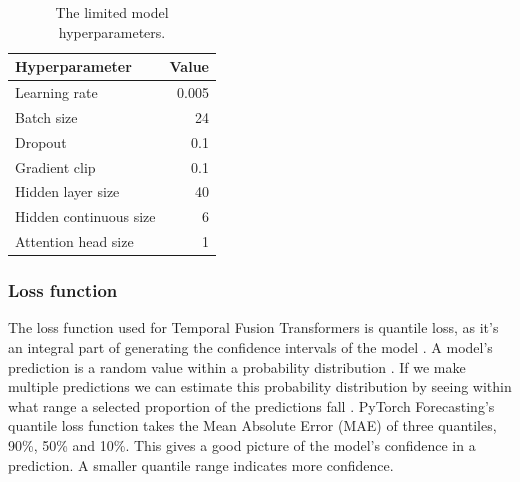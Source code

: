         \begin{table}[ht!]
        \begin{center}
        \caption{The limited model hyperparameters.
        \label{tab:lim_params}}
        \vspace{0.5cm}
        \begin{tabular}{|l|r|}
        \hline
        \textbf{Hyperparameter} & \textbf{Value} \\ \hline
        Learning rate            & 0.005         \\ \hline
        Batch size              & 24            \\ \hline
        Dropout                 & 0.1            \\ \hline
        Gradient clip           & 0.1           \\ \hline
        Hidden layer size            & 40         \\ \hline
        Hidden continuous size & 6         \\ \hline
        Attention head size    & 1         \\ \hline
        \end{tabular}
        
        \end{center}
        \end{table}
    
    \pagebreak
    \subsubsection{Loss function}\label{sec:loss_function}
    The loss function used for Temporal Fusion Transformers is quantile loss, as it's an integral part of generating the confidence intervals of the model \cite{lim_temporal_2020}.
    A model's prediction is a random value within a probability distribution \cite{wen_multi-horizon_2018}. If we make multiple predictions we can estimate this probability distribution by seeing within what range a selected proportion of the predictions fall \cite{koenker_quantile_2001}. PyTorch Forecasting's quantile loss function takes the Mean Absolute Error (MAE) of three quantiles, 90\%, 50\% and 10\%. This gives a good picture of the model's confidence in a prediction. A smaller quantile range indicates more confidence.
    
    
    